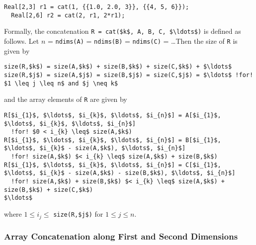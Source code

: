 \begin{example}
\begin{lstlisting}[language=modelica]
  Real[2,3] r1 = cat(1, {{1.0, 2.0, 3}}, {{4, 5, 6}});
  Real[2,6] r2 = cat(2, r1, 2*r1);
\end{lstlisting}
\end{example}

Formally, the concatenation \lstinline[mathescape=true]!R = cat($k$, A, B, C, $\ldots$)! is defined as follows.  Let $n$ = \lstinline!ndims(A)! = \lstinline!ndims(B)! = \lstinline!ndims(C)! = \ldots  Then the size of \lstinline!R! is given by
\begin{lstlisting}[language=modelica,escapechar=!,mathescape=true,frame=none,xleftmargin=1em]
size(R,$k$) = size(A,$k$) + size(B,$k$) + size(C,$k$) + $\ldots$
size(R,$j$) = size(A,$j$) = size(B,$j$) = size(C,$j$) = $\ldots$ !for! $1 \leq j \leq n$ and $j \neq k$
\end{lstlisting}
and the array elements of \lstinline!R! are given by
\begin{lstlisting}[language=modelica,escapechar=!,mathescape=true,frame=none,xleftmargin=1em]
R[$i_{1}$, $\ldots$, $i_{k}$, $\ldots$, $i_{n}$] = A[$i_{1}$, $\ldots$, $i_{k}$, $\ldots$, $i_{n}$]
  !for! $0 < i_{k} \leq$ size(A,$k$)
R[$i_{1}$, $\ldots$, $i_{k}$, $\ldots$, $i_{n}$] = B[$i_{1}$, $\ldots$, $i_{k}$ - size(A,$k$), $\ldots$, $i_{n}$]
  !for! size(A,$k$) $< i_{k} \leq$ size(A,$k$) + size(B,$k$)
R[$i_{1}$, $\ldots$, $i_{k}$, $\ldots$, $i_{n}$] = C[$i_{1}$, $\ldots$, $i_{k}$ - size(A,$k$) - size(B,$k$), $\ldots$, $i_{n}$]
  !for! size(A,$k$) + size(B,$k$) $< i_{k} \leq$ size(A,$k$) + size(B,$k$) + size(C,$k$)
$\ldots$
\end{lstlisting}
where $1 \leq i_{j} \leq$ \lstinline[mathescape=true]!size(R,$j$)! for $1 \leq j \leq n$.


\subsubsection{Array Concatenation along First and Second Dimensions}

